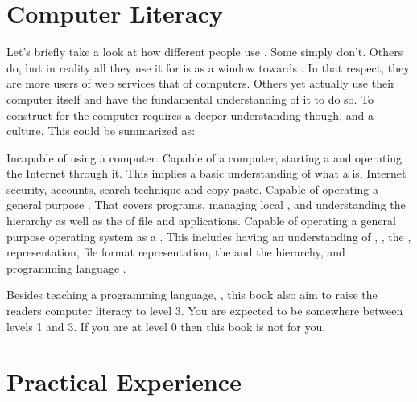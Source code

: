 \section{Computer Literacy}

Let's briefly take a look at how different people use . Some simply don't. Others do, but in reality all they use it for is as a window towards . In that respect, they are more users of web services that of computers. Others yet actually use their computer itself and have the fundamental understanding of it to do so. To construct  for the computer requires a deeper understanding though, and a culture. This could be summarized as:

\begin{itemize}
   Incapable of using a computer.
   Capable of  a computer, starting a  and operating the Internet through it. This implies a basic understanding of what a  is, Internet security, accounts, search technique and copy paste.
   Capable of operating a general purpose . That covers  programs, managing local , and understanding the  hierarchy as well as the  of file  and applications.
   Capable of operating a general purpose operating system as a . This includes having an understanding of , , the ,  representation, file format representation, the  and the  hierarchy, and programming language .
\end{itemize}

Besides teaching a programming language, \csharp, this book also aim to raise the readers computer literacy to level 3. You are expected to be somewhere between levels 1 and 3. If you are at level 0 then this book is not for you.

\section{Practical Experience}

